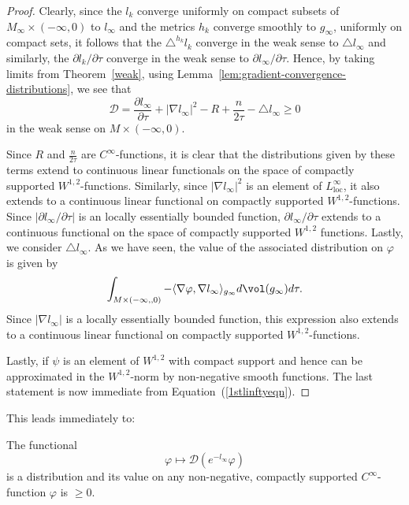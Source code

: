 \begin{proof}
Clearly, since the $l_k$ converge uniformly on compact subsets of
$M_{\infty}\times (-\infty,0)$ to $l_\infty$ and the metrics $h_k$
converge smoothly to $g_\infty$, uniformly on compact sets, it
follows that the $\triangle ^{h_k}l_k $ converge in the weak sense
to $\triangle l_\infty$ and similarly, the $\partial l_k/\partial
\tau$ converge in the weak sense to $\partial l_\infty/\partial
\tau$. Hence, by taking limits from Theorem~\ref{weak}, using
Lemma~\ref{lem:gradient-convergence-distributions}, we see that
\begin{equation}\label{1stlinftyeqn}
{\mathcal D}=\frac{\partial l_\infty}{\partial \tau}+|\nabla
l_\infty|^2-R+\frac{n}{2\tau}-\triangle l_\infty\ge 0\end{equation}
 in the weak sense on $M\times (-\infty,0)$.


Since $R$ and $\frac{n}{2\tau}$ are $C^\infty$-functions, it is
clear that the distributions given by these terms extend to
continuous linear functionals on the space of compactly supported
$W^{1,2}$-functions. Similarly, since $|\nabla l_\infty|^2$ is an
element of $L^\infty_\mathrm{loc}$, it also extends to a continuous
linear functional on compactly supported $W^{1,2}$-functions. Since
$|\partial l_\infty/\partial \tau|$ is an locally essentially
bounded function, $\partial l_\infty/\partial \tau$ extends to a
continuous functional on the space of compactly supported $W^{1,2}$
functions. Lastly, we consider $\triangle l_\infty$. As we have
seen, the value of the associated distribution on $\varphi$ is given
by
$$\int_{M\times (-\infty,,0)}-\langle \nabla \varphi,\nabla
l_\infty\rangle_{g_\infty} d\vol(g_\infty)d\tau.$$ Since
$|\nabla l_\infty|$ is a locally essentially bounded function, this
expression also extends to a continuous linear functional on
compactly supported $W^{1,2}$-functions.




Lastly, if $\psi$ is an element of $W^{1,2}$ with compact support
and hence can be approximated in the $W^{1,2}$-norm by non-negative
smooth functions. The last statement  is now immediate from
Equation~(\ref{1stlinftyeqn}).
\end{proof}


This leads immediately to:

\begin{corollary}\label{cor:weighted-distribution-nonnegative}
\label{etimesdis}
The functional
$$\varphi\mapsto{\mathcal D}(e^{-l_\infty}\varphi)$$ is a distribution and
its value on any non-negative, compactly supported $C^\infty$-function
$\varphi$ is $\ge 0$.
\end{corollary}


